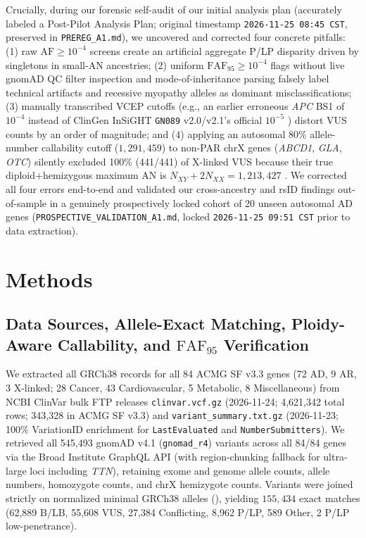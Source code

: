 \documentclass[11pt,letterpaper]{article}
\begin{document}
Crucially, during our forensic self-audit of our initial analysis plan (accurately labeled a Post-Pilot Analysis Plan; original timestamp \texttt{2026-11-25 08:45 CST}, preserved in \texttt{PREREG\_A1.md}), we uncovered and corrected four concrete pitfalls: (1) raw $\mathrm{AF}\ge 10^{-4}$ screens create an artificial aggregate P/LP disparity driven by singletons in small-AN ancestries; (2) uniform $\mathrm{FAF}_{95}\ge 10^{-4}$ flags without live gnomAD QC filter inspection and mode-of-inheritance parsing falsely label technical artifacts and recessive myopathy alleles as dominant misclassifications; (3) manually transcribed VCEP cutoffs (e.g., an earlier erroneous \textit{APC} BS1 of $10^{-4}$ instead of ClinGen InSiGHT \texttt{GN089} v2.0/v2.1's official $10^{-5}$ \citep{spier2024apc}) distort VUS counts by an order of magnitude; and (4) applying an autosomal $80\%$ allele-number callability cutoff ($1,291,459$) to non-PAR chrX genes (\textit{ABCD1}, \textit{GLA}, \textit{OTC}) silently excluded 100\% (441/441) of X-linked VUS because their true diploid+hemizygous maximum AN is $N_{XY}+2N_{XX}=1,213,427$ \citep{gnomadv41sex2024}. We corrected all four errors end-to-end and validated our cross-ancestry and rsID findings out-of-sample in a genuinely prospectively locked cohort of 20 unseen autosomal AD genes (\texttt{PROSPECTIVE\_VALIDATION\_A1.md}, locked \texttt{2026-11-25 09:51 CST} prior to data extraction).

\section{Methods}
\subsection{Data Sources, Allele-Exact Matching, Ploidy-Aware Callability, and $\mathrm{FAF}_{95}$ Verification}
We extracted all GRCh38 records for all 84 ACMG SF v3.3 genes (72 AD, 9 AR, 3 X-linked; 28 Cancer, 43 Cardiovascular, 5 Metabolic, 8 Miscellaneous) from NCBI ClinVar bulk FTP releases \texttt{clinvar.vcf.gz} (2026-11-24; 4,621,342 total rows; 343,328 in ACMG SF v3.3) and \texttt{variant\_summary.txt.gz} (2026-11-23; 100\% VariationID enrichment for \texttt{LastEvaluated} and \texttt{NumberSubmitters}). We retrieved all 545,493 gnomAD v4.1 (\texttt{gnomad\_r4}) variants across all 84/84 genes via the Broad Institute GraphQL API (with region-chunking fallback for ultra-large loci including \textit{TTN}), retaining exome and genome allele counts, allele numbers, homozygote counts, and chrX hemizygote counts. Variants were joined strictly on normalized minimal GRCh38 alleles (), yielding $155,434$ exact matches (62,889 B/LB, 55,608 VUS, 27,384 Conflicting, 8,962 P/LP, 589 Other, 2 P/LP low-penetrance).
\end{document}
